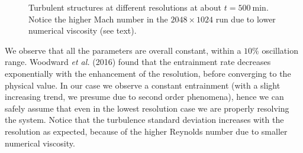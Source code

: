 \begin{figure}[t!]
  \centering
  \centering
      \hfill
    \caption{Turbulent structures at different resolutions at about $t=500 \ \mathrm{min}$. Notice the higher Mach number in the $2048 \times 1024$ run due to lower numerical viscosity (see text).}
    \label{fig:differentialmach}
 \end{figure}
We observe that all the parameters are overall constant, within a $10 \%$ oscillation range. Woodward \textit{et al.} (2016) found that the entrainment rate decreases exponentially with the enhancement of the resolution, before converging to the physical value. In our case we observe a constant entrainment (with a slight increasing trend, we presume due to second order phenomena), hence we can safely assume that even in the lowest resolution case we are properly resolving the system. Notice that the turbulence standard deviation increases with the resolution as expected, because of the higher Reynolds number due to smaller numerical viscosity. 

